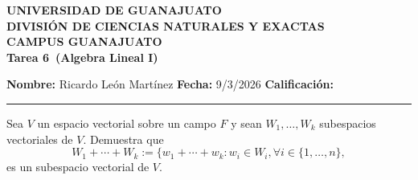 \documentclass[12pt,a4paper]{article}
\newcommand{\alumno}{Ricardo León Martínez}
\newcommand{\materia}{Algebra Lineal I}
\newcommand{\tarea}{Tarea 6}
\newcommand{\fecha}{9/3/2026}
\begin{document}
    \begin{center}
        {\large\textbf{UNIVERSIDAD DE GUANAJUATO}}\\[0.3cm]
        {\normalsize\textbf{DIVISIÓN DE CIENCIAS NATURALES Y EXACTAS}}\\
        {\normalsize\textbf{CAMPUS GUANAJUATO}}\\[1cm]

        {\Large\textbf{\tarea\ (\materia)}}\\[1cm]
    \end{center}

    \noindent
    \textbf{Nombre:} \alumno 
    \hfill 
    \textbf{Fecha:} \fecha 
    \hfill 
    \textbf{Calificación:} \rule{3cm}{0.4pt}

    \vspace{0.3cm}

    \begin{mdframed}[style=mdbluebox,frametitle={Ejercicio 1}]
        Sea $V$ un espacio vectorial sobre un campo $F$ y sean
        $W_{1},\dots,W_{k}$ subespacios vectoriales de $V$.
        Demuestra que
        \begin{equation*}
            W_{1}+\cdots+W_{k}:=\{w_{1}+\cdots+w_{k}:w_{i}\in W_{i},\forall i\in\{1,\dots,n\},
        \end{equation*}
        es un subespacio vectorial de $V$.
    \end{mdframed}
\end{document}
